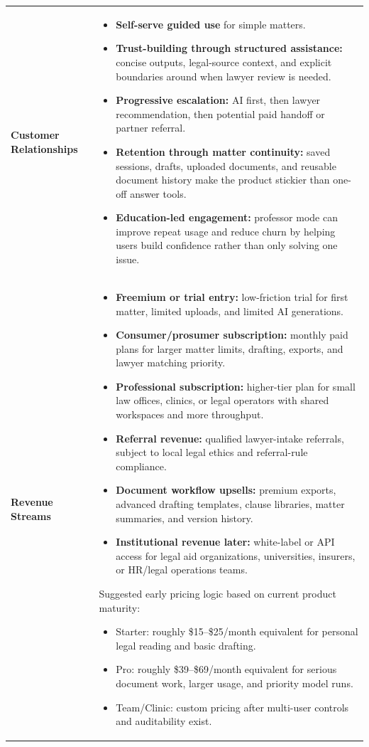 \documentclass[11pt]{article}
\begin{document}
\begin{longtable}{p{} p{}}
\textbf{Customer Relationships} &
\begin{itemize}
  \item \textbf{Self-serve guided use} for simple matters.
  \item \textbf{Trust-building through structured assistance:} concise outputs, legal-source context, and explicit boundaries around when lawyer review is needed.
  \item \textbf{Progressive escalation:} AI first, then lawyer recommendation, then potential paid handoff or partner referral.
  \item \textbf{Retention through matter continuity:} saved sessions, drafts, uploaded documents, and reusable document history make the product stickier than one-off answer tools.
  \item \textbf{Education-led engagement:} professor mode can improve repeat usage and reduce churn by helping users build confidence rather than only solving one issue.
\end{itemize} \\

\textbf{Revenue Streams} &
\begin{itemize}
  \item \textbf{Freemium or trial entry:} low-friction trial for first matter, limited uploads, and limited AI generations.
  \item \textbf{Consumer/prosumer subscription:} monthly paid plans for larger matter limits, drafting, exports, and lawyer matching priority.
  \item \textbf{Professional subscription:} higher-tier plan for small law offices, clinics, or legal operators with shared workspaces and more throughput.
  \item \textbf{Referral revenue:} qualified lawyer-intake referrals, subject to local legal ethics and referral-rule compliance.
  \item \textbf{Document workflow upsells:} premium exports, advanced drafting templates, clause libraries, matter summaries, and version history.
  \item \textbf{Institutional revenue later:} white-label or API access for legal aid organizations, universities, insurers, or HR/legal operations teams.
\end{itemize}

Suggested early pricing logic based on current product maturity:
\begin{itemize}
  \item Starter: roughly \$15--\$25/month equivalent for personal legal reading and basic drafting.
  \item Pro: roughly \$39--\$69/month equivalent for serious document work, larger usage, and priority model runs.
  \item Team/Clinic: custom pricing after multi-user controls and auditability exist.
\end{itemize}


\end{longtable}
\end{document}
